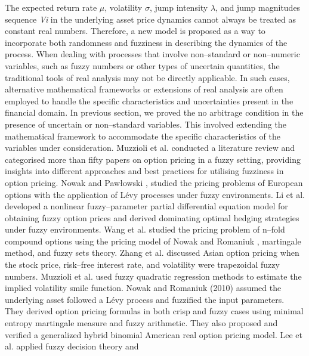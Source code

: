 \documentclass[12pt,a4paper]{report}
\numberwithin{equation}{section}
\begin{document}
The expected return rate \emph{$\mu$}, volatility \emph{$\sigma$}, jump intensity
\emph{$\lambda$}, and jump magnitudes sequence \emph{Vi} in the underlying asset
price dynamics cannot always be treated as constant real numbers.
Therefore, a new model is proposed as a way to incorporate both
randomness and fuzziness in describing the dynamics of the process. When
dealing with processes that involve non--standard or non--numeric
variables, such as fuzzy numbers or other types of uncertain quantities,
the traditional tools of real analysis may not be directly applicable.
In such cases, alternative mathematical frameworks or extensions of real
analysis are often employed to handle the specific characteristics and
uncertainties present in the financial domain. In previous section, we
proved the no arbitrage condition in the presence of uncertain or
non--standard variables. This involved extending the mathematical
framework to accommodate the specific characteristics of the variables
under consideration. Muzzioli et al. \cite{muzzioli2017fuzzy_94} conducted a literature
review and categorised more than fifty papers on option pricing in a
fuzzy setting, providing insights into different approaches and best
practices for utilising fuzziness in option pricing. Nowak and Pawłowski
\cite{nowak2017option_95}, \cite{nowak2019pricing_96} studied the pricing problems of European options with
the application of Lévy processes under fuzzy environments. Li et al.
\cite{li2018application_97} developed a nonlinear fuzzy--parameter partial differential
equation model for obtaining fuzzy option prices and derived dominating
optimal hedging strategies under fuzzy environments. Wang et al.
\cite{wang2016geometric_98} studied the pricing problem of n--fold compound options using
the pricing model of Nowak and Romaniuk \cite{nowak2014application_99}, martingale method, and
fuzzy sets theory. Zhang et al. \cite{zhang2015fuzzy_100} discussed Asian option pricing
when the stock price, risk--free interest rate, and volatility were
trapezoidal fuzzy numbers. Muzzioli et al. \cite{muzzioli2015comparison_101} used fuzzy
quadratic regression methods to estimate the implied volatility smile
function. Nowak and Romaniuk \cite{nowak2010computing_102} (2010) assumed the underlying
asset followed a Lévy process and fuzzified the input parameters. They
derived option pricing formulas in both crisp and fuzzy cases using
minimal entropy martingale measure and fuzzy arithmetic. They also
proposed and verified a generalized hybrid binomial American real option
pricing model. Lee et al. \cite{lee2005new_103} applied fuzzy decision theory and
\end{document}
